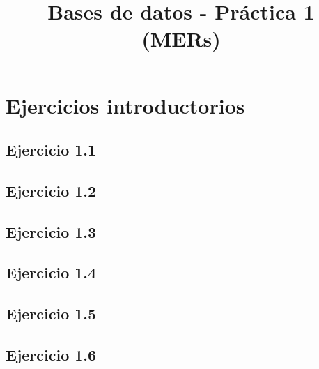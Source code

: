 
\usepackage[landscape]{geometry}
\title{Bases de datos - Práctica 1 (MERs)}
\author{}







\maketitle
\tableofcontents
\newpage

\section{Ejercicios introductorios}

\subsection{Ejercicio 1.1}


\newpage
\subsection{Ejercicio 1.2}


\newpage
\subsection{Ejercicio 1.3}


\newpage
\subsection{Ejercicio 1.4}


\newpage
\subsection{Ejercicio 1.5}


\newpage
\subsection{Ejercicio 1.6}


\newpage
\subsection{}


